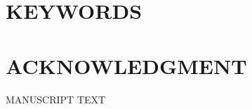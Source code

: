 \documentclass[12pt,english]{article}
\begin{document}
\section*{KEYWORDS}
\PAPERKEYWORDS
\clearpage 

\doublespacing
\section*{ACKNOWLEDGMENT}
\ACKNOWLEDGMENTS
\clearpage 

\setcounter{page}{1}
\renewcommand*{\thefootnote}{\arabic{footnote}}
\begingroup
  \centering
  \Large MANUSCRIPT TEXT\\[1em]
\endgroup


\pagebreak
\begingroup
{}
\setlength\bibitemsep{5.0pt}
\printbibliography[title=References for Manuscript]
\endgroup
\pagebreak



\clearpage 
\newpage

\appendix
\begin{refsection}

\setcounter{page}{1}
\end{refsection}
\end{document}

